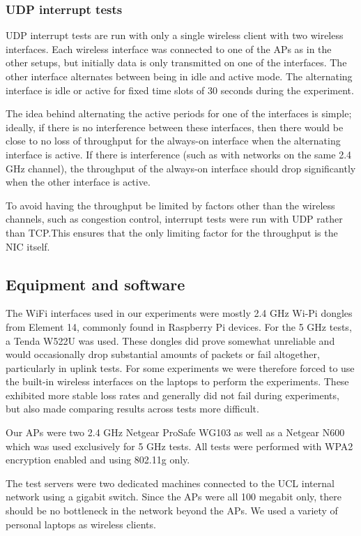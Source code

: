 \subsubsection{UDP interrupt tests}
\label{sec:met:setups:intudp}
UDP interrupt tests are run with only a single wireless client with two wireless
interfaces. Each wireless interface was connected to one of the APs as in the
other setups, but initially data is only transmitted on one of the interfaces.
The other interface alternates between being in idle and active mode. The
alternating interface is idle or active for fixed time slots of 30 seconds
during the experiment.

The idea behind alternating the active periods for one of the interfaces is
simple; ideally, if there is no interference between these interfaces, then
there would be close to no loss of throughput for the always-on interface when
the alternating interface is active. If there is interference (such as with
networks on the same 2.4 GHz channel), the throughput of the always-on interface
should drop significantly when the other interface is active.

To avoid having the throughput be limited by factors other than the wireless
channels, such as congestion control, interrupt tests were run with UDP rather
than TCP.\@ This ensures that the only limiting factor for the throughput is the
NIC itself.

\subsection{Equipment and software}
\label{sec:met:equip}
The WiFi interfaces used in our experiments were mostly 2.4 GHz Wi-Pi dongles
from Element 14, commonly found in Raspberry Pi devices. For the 5 GHz tests, a
Tenda W522U was used. These dongles did prove somewhat unreliable and would
occasionally drop substantial amounts of packets or fail altogether,
particularly in uplink tests.  For some experiments we were therefore forced to
use the built-in wireless interfaces on the laptops to perform the experiments.
These exhibited more stable loss rates and generally did not fail during
experiments, but also made comparing results across tests more difficult.

Our APs were two 2.4 GHz Netgear ProSafe WG103 as well as a Netgear N600 which
was used exclusively for 5 GHz tests. All tests were performed with WPA2
encryption enabled and using 802.11g only.

The test servers were two dedicated machines connected to the UCL internal
network using a gigabit switch. Since the APs were all 100 megabit only, there
should be no bottleneck in the network beyond the APs. We used a variety of
personal laptops as wireless clients.

